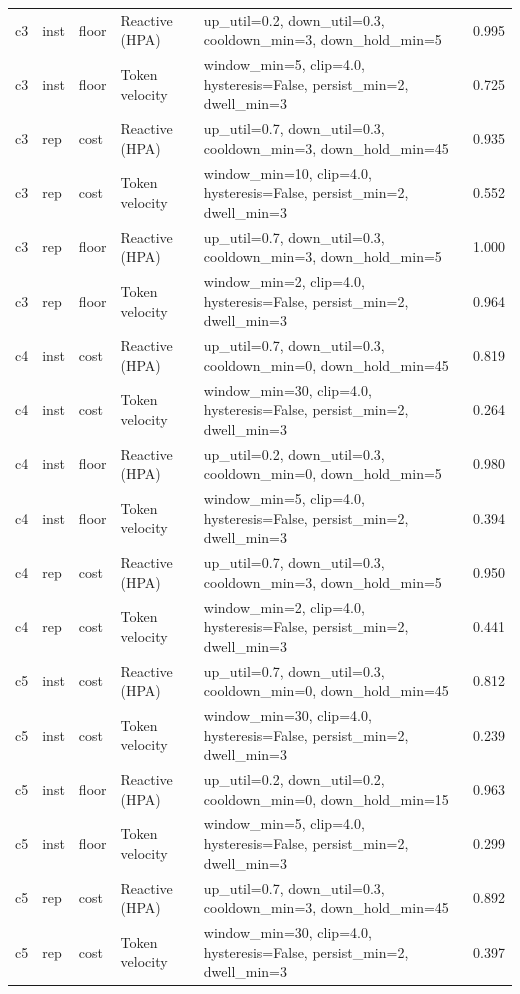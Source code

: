 \begin{tabular}{@{}llllp{}r@{}}
c3 & inst & floor & Reactive (HPA) & up\_util=0.2, down\_util=0.3, cooldown\_min=3, down\_hold\_min=5 & 0.995 \\
c3 & inst & floor & Token velocity & window\_min=5, clip=4.0, hysteresis=False, persist\_min=2, dwell\_min=3 & 0.725 \\
c3 & rep & cost & Reactive (HPA) & up\_util=0.7, down\_util=0.3, cooldown\_min=3, down\_hold\_min=45 & 0.935 \\
c3 & rep & cost & Token velocity & window\_min=10, clip=4.0, hysteresis=False, persist\_min=2, dwell\_min=3 & 0.552 \\
c3 & rep & floor & Reactive (HPA) & up\_util=0.7, down\_util=0.3, cooldown\_min=3, down\_hold\_min=5 & 1.000 \\
c3 & rep & floor & Token velocity & window\_min=2, clip=4.0, hysteresis=False, persist\_min=2, dwell\_min=3 & 0.964 \\
c4 & inst & cost & Reactive (HPA) & up\_util=0.7, down\_util=0.3, cooldown\_min=0, down\_hold\_min=45 & 0.819 \\
c4 & inst & cost & Token velocity & window\_min=30, clip=4.0, hysteresis=False, persist\_min=2, dwell\_min=3 & 0.264 \\
c4 & inst & floor & Reactive (HPA) & up\_util=0.2, down\_util=0.3, cooldown\_min=0, down\_hold\_min=5 & 0.980 \\
c4 & inst & floor & Token velocity & window\_min=5, clip=4.0, hysteresis=False, persist\_min=2, dwell\_min=3 & 0.394 \\
c4 & rep & cost & Reactive (HPA) & up\_util=0.7, down\_util=0.3, cooldown\_min=3, down\_hold\_min=5 & 0.950 \\
c4 & rep & cost & Token velocity & window\_min=2, clip=4.0, hysteresis=False, persist\_min=2, dwell\_min=3 & 0.441 \\
c5 & inst & cost & Reactive (HPA) & up\_util=0.7, down\_util=0.3, cooldown\_min=0, down\_hold\_min=45 & 0.812 \\
c5 & inst & cost & Token velocity & window\_min=30, clip=4.0, hysteresis=False, persist\_min=2, dwell\_min=3 & 0.239 \\
c5 & inst & floor & Reactive (HPA) & up\_util=0.2, down\_util=0.2, cooldown\_min=0, down\_hold\_min=15 & 0.963 \\
c5 & inst & floor & Token velocity & window\_min=5, clip=4.0, hysteresis=False, persist\_min=2, dwell\_min=3 & 0.299 \\
c5 & rep & cost & Reactive (HPA) & up\_util=0.7, down\_util=0.3, cooldown\_min=3, down\_hold\_min=45 & 0.892 \\
c5 & rep & cost & Token velocity & window\_min=30, clip=4.0, hysteresis=False, persist\_min=2, dwell\_min=3 & 0.397 \\
\bottomrule
\end{tabular}

